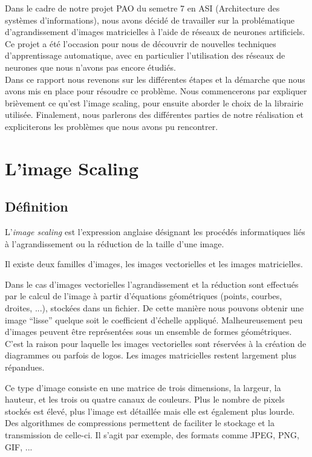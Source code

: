 \documentclass[12pt, a4paper]{article}
\begin{document}
Dans le cadre de notre projet PAO du semetre 7 en ASI (Architecture des systèmes d'informations), nous avons décidé de travailler sur la problématique d'agrandissement d'images matricielles à l'aide de réseaux de neurones artificiels.
\\

Ce projet a été l'occasion pour nous de découvrir de nouvelles techniques d'apprentissage automatique, avec en particulier l'utilisation des réseaux de neurones que nous n'avons pas encore étudiés.
\\

Dans ce rapport nous revenons sur les différentes étapes et la démarche que nous avons mis en place pour résoudre ce problème. Nous commencerons par expliquer brièvement ce qu'est l'image scaling, pour ensuite aborder le choix de la librairie utilisée. Finalement, nous parlerons des différentes parties de notre réalisation et expliciterons les problèmes que nous avons pu rencontrer.


\newpage

\section{L'image Scaling}

\subsection{Définition}
L'\textit{image scaling} est l'expression anglaise désignant les procédés informatiques liés à l'agrandissement ou la réduction de la taille d'une image.

Il existe deux familles d'images, les images vectorielles et les images matricielles.

Dans le cas d'images vectorielles l'agrandissement et la réduction sont effectués par le calcul de l'image à partir d'équations géométriques (points, courbes, droites, ...), stockées dans un fichier. De cette manière nous pouvons obtenir une image ``lisse'' quelque soit le coefficient d'échelle appliqué. Malheureusement peu d'images peuvent être représentées sous un ensemble de formes géométriques. C'est la raison pour laquelle les images vectorielles sont réservées à la création de diagrammes ou parfois de logos. Les images matricielles restent largement plus répandues.

Ce type d'image consiste en une matrice de trois dimensions, la largeur, la hauteur, et les trois ou quatre canaux de couleurs. Plus le nombre de pixels stockés est élevé, plus l'image est détaillée mais elle est également plus lourde. Des algorithmes de compressions permettent de faciliter le stockage et la transmission de celle-ci. Il s'agit par exemple, des formats comme JPEG, PNG, GIF, ...
\end{document}
